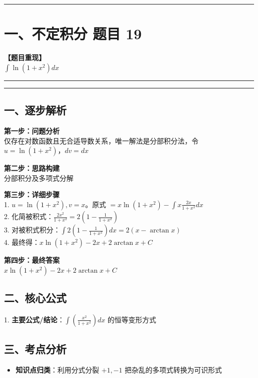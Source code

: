 ﻿\documentclass[12pt, a4paper]{ctexart}
\newcommand{\TopSeparator}{
    \par\noindent\rule{\textwidth}{1.5pt}\vspace{0.5em}
}
\newcommand{\AnalysisSeparator}{
    \par\noindent\rule{\textwidth}{0.5pt}\vspace{0.2em}\hrule\vspace{0.5em}
}
\newenvironment{RedAnalysis}{
    \par
    \color{red} 
}{
    \par
    \color{black} 
}
\begin{document}
\vspace{2em}

\TopSeparator
\section*{一、不定积分 题目 19}

\textbf{【题目重现】} \\
$\int \ln(1+x^2) dx$

\AnalysisSeparator

\begin{RedAnalysis}

	\subsection*{一、逐步解析}

	\textbf{第一步：问题分析} \\
	仅存在对数函数且无合适导数关系，唯一解法是分部积分法，令 $u=\ln(1+x^2)$，$dv=dx$

	\textbf{第二步：思路构建} \\
	分部积分及多项式分解

	\textbf{第三步：详细步骤} \\
	1. $u = \ln(1+x^2), v = x$。原式 $= x\ln(1+x^2) - \int x \frac{2x}{1+x^2} dx$ \\ 
	2. 化简被积式：$\frac{2x^2}{1+x^2} = 2(1 - \frac{1}{1+x^2})$ \\ 
	3. 对被积式积分：$\int 2(1 - \frac{1}{1+x^2}) dx = 2(x - \arctan x)$ \\ 
	4. 最终得：$x\ln(1+x^2) - 2x + 2\arctan x + C$

	\textbf{第四步：最终答案} \\
	$x\ln(1+x^2) - 2x + 2\arctan x + C$

	\subsection*{二、核心公式}
	1. \textbf{主要公式/结论}：$\int (\frac{x^2}{1+x^2}) dx \text{ 的恒等变形方式}$

	\subsection*{三、考点分析}
	\begin{itemize}
		\item \textbf{知识点归类}：利用分式分裂 $+1, -1$ 把杂乱的多项式转换为可识形式
	\end{itemize}

\end{RedAnalysis}
\end{document}

